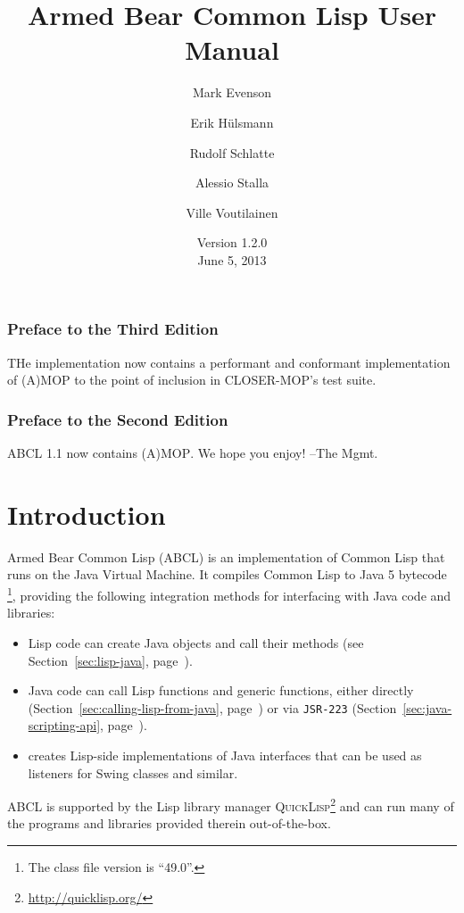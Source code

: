 \documentclass[10pt]{book}
\begin{document}
\title{Armed Bear Common Lisp User Manual}
\date{Version 1.2.0\\
\smallskip
June 5, 2013}
\author{Mark Evenson \and Erik H\"{u}lsmann \and Rudolf Schlatte \and
  Alessio Stalla \and Ville Voutilainen}

\maketitle

\tableofcontents

\subsection{Preface to the Third Edition}
THe implementation now contains a performant and conformant
implementation of (A)MOP to the point of inclusion in CLOSER-MOP's
test suite.


\subsection{Preface to the Second Edition}

\textsc{ABCL} 1.1 now contains \textsc{(A)MOP}.  We hope you enjoy!  --The Mgmt.

\chapter{Introduction}

Armed Bear Common Lisp (\textsc{ABCL}) is an implementation of Common
Lisp that runs on the Java Virtual Machine.  It compiles Common Lisp
to Java 5 bytecode \footnote{The class file version is ``49.0''.},
providing the following integration methods for interfacing with Java
code and libraries:
\begin{itemize}
\item Lisp code can create Java objects and call their methods (see
  Section~\ref{sec:lisp-java}, page~\pageref{sec:lisp-java}).
\item Java code can call Lisp functions and generic functions, either
  directly (Section~\ref{sec:calling-lisp-from-java},
  page~\pageref{sec:calling-lisp-from-java}) or via \texttt{JSR-223}
  (Section~\ref{sec:java-scripting-api},
  page~\pageref{sec:java-scripting-api}).
\item {} creates Lisp-side implementations
  of Java interfaces that can be used as listeners for Swing classes and
  similar.
\end{itemize}
\textsc{ABCL} is supported by the Lisp library manager
\textsc{QuickLisp}\footnote{\url{http://quicklisp.org/}} and can run many of the
programs and libraries provided therein out-of-the-box.
\end{document}
